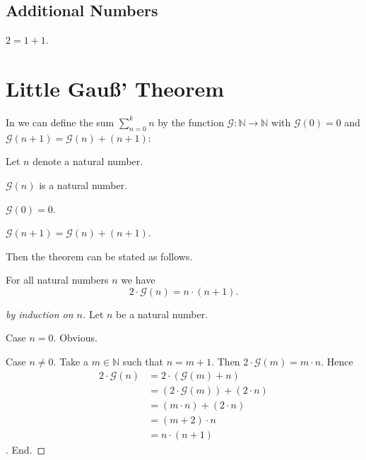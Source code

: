 \documentclass[english]{article}
\newcommand{\gauss}{\mathcal{G}}
\begin{document}
\subsection{Additional Numbers}

\begin{forthel}
  \begin{definition}
    $2 = 1 + 1$.
  \end{definition}
\end{forthel}


\section{Little Gauß' Theorem}

In \Naproche we can define the sum $\sum_{n = 0}^k n$ by the function
$\gauss : \mathbb{N} \to \mathbb{N}$ with $\gauss(0) = 0$ and
$\gauss(n + 1) = \gauss(n) + (n + 1)$:

\begin{forthel}
  Let $n$ denote a natural number.

  \begin{signature*}
    $\gauss(n)$ is a natural number.
  \end{signature*}

  \begin{axiom*}
    $\gauss(0) = 0$.
  \end{axiom*}

  \begin{axiom*}
    $\gauss(n + 1) = \gauss(n) + (n + 1)$.
  \end{axiom*}
\end{forthel}

\noindent Then the theorem can be stated as follows.

\begin{forthel}
  \begin{theorem*}\label{little_gauss}
    For all natural numbers $n$ we have
    \[2 \cdot \gauss(n) = n \cdot (n + 1).\]
  \end{theorem*}
  \begin{proof}[by induction on $n$]
    Let $n$ be a natural number.

    Case $n = 0$. Obvious.

    Case $n \neq 0$.
      Take a $m \in \mathbb{N}$ such that $n = m + 1$.
      Then $2 \cdot \gauss(m) = m \cdot n$.
      Hence
      \begin{align*}
            2 \cdot \gauss(n)
        & = 2 \cdot (\gauss(m) + n)           \\
        & = (2 \cdot \gauss(m)) + (2 \cdot n) \\
        & = (m \cdot n) + (2 \cdot n)         \\
        & = (m + 2) \cdot n                   \\
        & = n \cdot (n + 1)
      \end{align*}.
    End.
  \end{proof}
\end{forthel}

\end{document}

